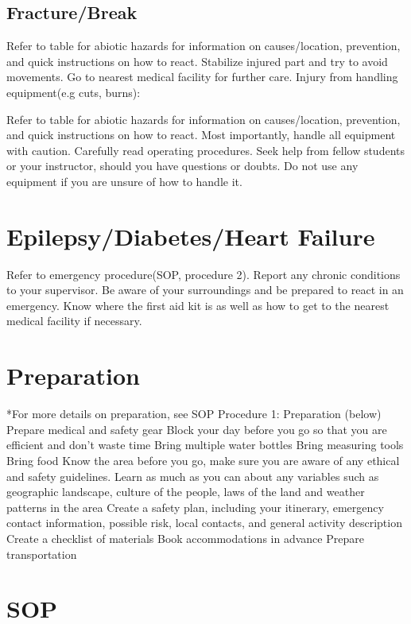 \documentclass[12pt]{../SOP2}
\begin{document}
\subsection{Fracture/Break}

\NP Refer to table for abiotic hazards for information on causes/location, prevention, and quick instructions on how to react. Stabilize injured part and try to avoid movements. Go to nearest medical facility for further care.
Injury from handling equipment(e.g cuts, burns):


\NP Refer to table for abiotic hazards for information on causes/location, prevention, and quick instructions on how to react. Most importantly, handle all equipment with caution. Carefully read operating procedures. Seek help from fellow students or your instructor, should you have questions or doubts. Do not use any equipment if you are unsure of how to handle it. 

\section{Epilepsy/Diabetes/Heart Failure}

Refer to emergency procedure(SOP, procedure 2).
Report any chronic conditions to your supervisor.
Be aware of your surroundings and be prepared to react in an emergency.
Know where the first aid kit is as well as how to get to the nearest medical facility if necessary. 


\section{Preparation}

*For more details on preparation, see SOP Procedure 1: Preparation (below)
Prepare medical and safety gear 
Block your day before you go so that you are efficient and don't waste time
Bring multiple water bottles
Bring measuring tools
Bring food
Know the area before you go, make sure you are aware of any ethical and safety guidelines. Learn as much as you can about any variables such as geographic landscape, culture of the people, laws of the land and weather patterns in the area
Create a safety plan, including your itinerary, emergency contact information, possible risk, local contacts, and general activity description 
Create a checklist of materials 
Book accommodations in advance
Prepare transportation

\section{SOP}
\end{document}
